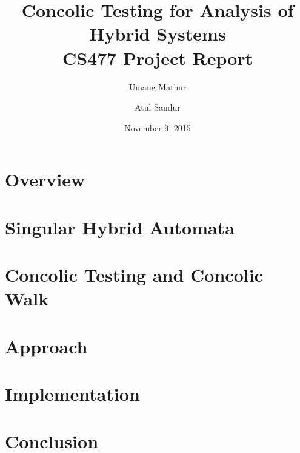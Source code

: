 \documentclass{article}
\title{Concolic Testing for Analysis of Hybrid Systems  \\
\large CS477 Project Report}
\author{Umang Mathur \and Atul Sandur}
\date{November 9, 2015}
\begin{document}
\maketitle

\section{Overview}



\section{Singular Hybrid Automata}
\label{sec:sha}


\section{Concolic Testing and Concolic Walk}
\label{sec:concolic}


\section{Approach}
\label{sec:approach}


\section{Implementation}
\label{sec:implementation}


%

\section{Conclusion}
\label{sec:conclusion}






\end{document}
